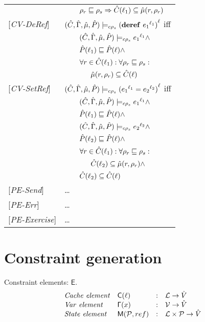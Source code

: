 \begin{tabular} {l l l l}
&&\multicolumn{2}{l}{$\rho_r \sqsubseteq \rho_s \Rightarrow \hat{C}(\ell_1) \subseteq \hat{\mu}(r, \rho_r) $}\\
{[\textit{CV-DeRef}]}&\multicolumn{3}{l}{$(\hat{C},\hat{\Gamma},\hat{\mu},\hat{P}) \models_{c \rho_s} {(\mathbf{deref}\ {e_1}^{\ell_1})}^{\ell} $ iff}\\
&&\multicolumn{2}{l}{$ (\hat{C},\hat{\Gamma},\hat{\mu},\hat{P}) \models_{c \rho_s} {e_1}^{\ell_1}\wedge $}\\
&&\multicolumn{2}{l}{$\hat{P}(\ell_1) \sqsubseteq \hat{P}(\ell) \wedge$}\\
&&\multicolumn{2}{l}{$\forall r \in \hat{C}(\ell_1) : \forall \rho_r \sqsubseteq \rho_s :$}\\
&&&$\hat{\mu}(r, \rho_r) \subseteq \hat{C}(\ell)$ \\
{[\textit{CV-SetRef}]}&\multicolumn{3}{l}{$(\hat{C},\hat{\Gamma},\hat{\mu},\hat{P}) \models_{c \rho_s} {({e_1}^{\ell_1} = {e_2}^{\ell_2})}^{\ell} $ iff}\\
&&\multicolumn{2}{l}{$ (\hat{C},\hat{\Gamma},\hat{\mu},\hat{P}) \models_{c \rho_s} {e_1}^{\ell_1} \wedge $}\\
&&\multicolumn{2}{l}{$ \hat{P}(\ell_1) \sqsubseteq \hat{P}(\ell) \wedge $}\\
&&\multicolumn{2}{l}{$ (\hat{C},\hat{\Gamma},\hat{\mu},\hat{P}) \models_{c \rho_s} {e_2}^{\ell_2} \wedge $}\\
&&\multicolumn{2}{l}{$ \hat{P}(\ell_2) \sqsubseteq \hat{P}(\ell) \wedge $}\\
&&\multicolumn{2}{l}{$ \forall r \in \hat{C}(\ell_1) : \forall \rho_r \sqsubseteq \rho_s :$}\\
&&&$\hat{C}(\ell_2) \subseteq \hat{\mu}(r, \rho_r) \wedge$ \\
&&\multicolumn{2}{l}{$\hat{C}(\ell_2) \subseteq \hat{C}(\ell) $} \\
{[\textit{PE-Send}]}& \dots \\
{[\textit{PE-Err}]}& \dots \\
{[\textit{PE-Exercise}]}& \dots \\
\end{tabular}

\section{Constraint generation}
\label{sec:ConstraintGen}
\newcommand{\genl}[1]{\mathcal{C}_{*\rho_s}\llbracket (#1)^\ell \rrbracket}
\newcommand{\gen}[1]{\mathcal{C}_{*\rho_s}\llbracket (#1) \rrbracket}
\newcommand{\Cel}{\mathsf{C}}
\newcommand{\Rel}{\mathsf{\Gamma}}
\newcommand{\Pel}{\mathsf{P}}
\newcommand{\Mel}{\mathsf{M}}
\newcommand{\El}{\mathsf{E}}
\newcommand{\braces}[1]{\{ #1 \} }
\newcommand{\parens}[1]{\( #1 \) }

Constraint elements: $\El$.
\[
\begin{array}{llcl}
\mathit{Cache\ element} & \Cel(\ell)& : & \labs \rightarrow \absvalues \\
\mathit{Var\ element} & \Rel(x) & : & \vars \rightarrow \absvalues \\
\mathit{State\ element} & \Mel(\perms, ref) & : & \labs \times \perms \rightarrow \absvalues \\
\end{array}
\]

